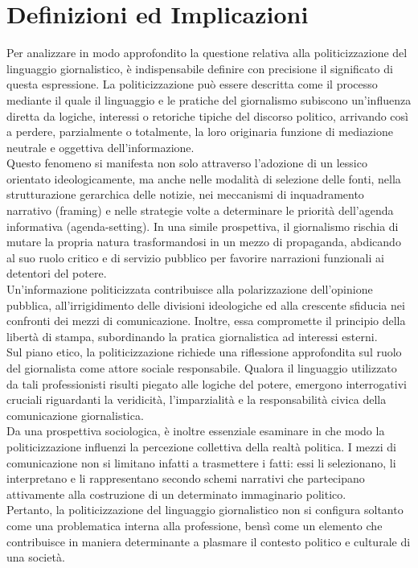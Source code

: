 \section{Definizioni ed Implicazioni}
Per analizzare in modo approfondito la questione relativa alla politicizzazione del linguaggio giornalistico, è indispensabile definire con precisione il significato di questa espressione. La politicizzazione può essere descritta come il processo mediante il quale il linguaggio e le pratiche del giornalismo subiscono un'influenza diretta da logiche, interessi o retoriche tipiche del discorso politico, arrivando così a perdere, parzialmente o totalmente, la loro originaria funzione di mediazione neutrale e oggettiva dell'informazione. \\
Questo fenomeno si manifesta non solo attraverso l’adozione di un lessico orientato ideologicamente, ma anche nelle modalità di selezione delle fonti, nella strutturazione gerarchica delle notizie, nei meccanismi di inquadramento narrativo (\gls{framing}) e nelle strategie volte a determinare le priorità dell’agenda informativa (\gls{agenda-setting}). In una simile prospettiva, il giornalismo rischia di mutare la propria natura trasformandosi in un mezzo di propaganda, abdicando al suo ruolo critico e di servizio pubblico per favorire narrazioni funzionali ai detentori del potere. \\
Un’informazione politicizzata contribuisce alla polarizzazione dell’opinione pubblica, all’irrigidimento delle divisioni ideologiche ed alla crescente sfiducia nei confronti dei mezzi di comunicazione. Inoltre, essa compromette il principio della libertà di stampa, subordinando la pratica giornalistica ad interessi esterni. \\
Sul piano etico, la politicizzazione richiede una riflessione approfondita sul ruolo del giornalista come attore sociale responsabile. Qualora il linguaggio utilizzato da tali professionisti risulti piegato alle logiche del potere, emergono interrogativi cruciali riguardanti la veridicità, l’imparzialità e la responsabilità civica della comunicazione giornalistica. \\
Da una prospettiva sociologica, è inoltre essenziale esaminare in che modo la politicizzazione influenzi la percezione collettiva della realtà politica. I mezzi di comunicazione non si limitano infatti a trasmettere i fatti: essi li selezionano, li interpretano e li rappresentano secondo schemi narrativi che partecipano attivamente alla costruzione di un determinato immaginario politico. \\
Pertanto, la politicizzazione del linguaggio giornalistico non si configura soltanto come una problematica interna alla professione, bensì come un elemento che contribuisce in maniera determinante a plasmare il contesto politico e culturale di una società.

